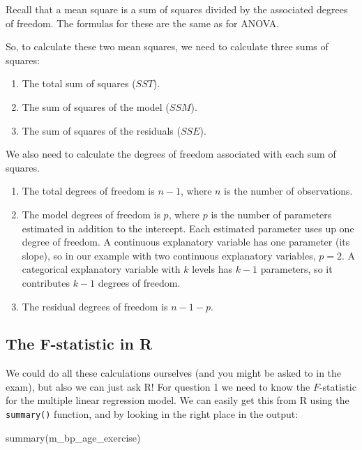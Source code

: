 \documentclass[
  letterpaper,
  8pt,
  a4paper]{book}
\newenvironment{Shaded}{\begin{snugshade}}{\end{snugshade}}
\newcommand{\FunctionTok}[1]{\textcolor[rgb]{0.28,0.35,0.67}{#1}}
\newcommand{\NormalTok}[1]{\textcolor[rgb]{0.00,0.23,0.31}{#1}}
\providecommand{\tightlist}{%
  \setlength{\itemsep}{0pt}\setlength{\parskip}{0pt}}
\begin{document}
Recall that a mean square is a sum of squares divided by the associated
degrees of freedom. The formulas for these are the same as for ANOVA.

So, to calculate these two mean squares, we need to calculate three sums
of squares:

\begin{enumerate}
\def\labelenumi{\arabic{enumi}.}
\tightlist
\item
  The total sum of squares (\(SST\)).
\item
  The sum of squares of the model (\(SSM\)).
\item
  The sum of squares of the residuals (\(SSE\)).
\end{enumerate}

We also need to calculate the degrees of freedom associated with each
sum of squares.

\begin{enumerate}
\def\labelenumi{\arabic{enumi}.}
\tightlist
\item
  The total degrees of freedom is \(n-1\), where \(n\) is the number of
  observations.
\item
  The model degrees of freedom is \(p\), where \(p\) is the number of
  parameters estimated in addition to the intercept. Each estimated
  parameter uses up one degree of freedom. A continuous explanatory
  variable has one parameter (its slope), so in our example with two
  continuous explanatory variables, \(p = 2\). A categorical explanatory
  variable with \(k\) levels has \(k-1\) parameters, so it contributes
  \(k-1\) degrees of freedom.
\item
  The residual degrees of freedom is \(n-1-p\).
\end{enumerate}

\subsection*{The F-statistic in R}\label{the-f-statistic-in-r}

We could do all these calculations ourselves (and you might be asked to
in the exam), but also we can just ask R! For question 1 we need to know
the \(F\)-statistic for the multiple linear regression model. We can
easily get this from R using the \texttt{summary()} function, and by
looking in the right place in the output:

\begin{Shaded}
\begin{Highlighting}[]
\FunctionTok{summary}\NormalTok{(m\_bp\_age\_exercise)}
\end{Highlighting}
\end{Shaded}
\end{document}
